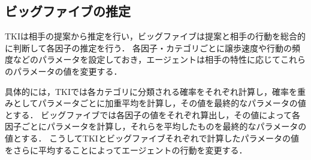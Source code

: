 \subsection{ビッグファイブの推定}

TKIは相手の提案から推定を行い，ビッグファイブは提案と相手の行動を総合的に判断して各因子の推定を行う．
各因子・カテゴリごとに譲歩速度や行動の頻度などのパラメータを設定しておき，エージェントは相手の特性に応じてこれらのパラメータの値を変更する．


具体的には，TKIでは各カテゴリに分類される確率をそれぞれ計算し，確率を重みとしてパラメータごとに加重平均を計算し，その値を最終的なパラメータの値とする．
ビッグファイブでは各因子の値をそれぞれ算出し，その値によって各因子ごとにパラメータを計算し，それらを平均したものを最終的なパラメータの値とする．
こうしてTKIとビッグファイブそれぞれで計算したパラメータの値をさらに平均することによってエージェントの行動を変更する．


